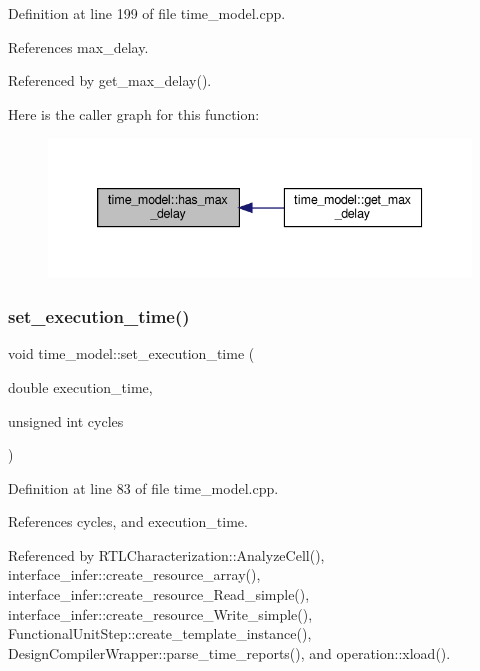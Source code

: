 Definition at line 199 of file time\+\_\+model.\+cpp.



References max\+\_\+delay.



Referenced by get\+\_\+max\+\_\+delay().

Here is the caller graph for this function\+:
\nopagebreak
\begin{figure}[H]
\begin{center}
\leavevmode
\includegraphics[width=339pt]{d3/d73/classtime__model_a952ed32fa9811586da4af0c94471f7ae_icgraph}
\end{center}
\end{figure}
\mbox{\label{classtime__model_a7bdad7b4a8221d4e5e00286e38084de1}} 
\subsubsection{\texorpdfstring{set\+\_\+execution\+\_\+time()}{set\_execution\_time()}}
{\footnotesize\ttfamily void time\+\_\+model\+::set\+\_\+execution\+\_\+time (\begin{DoxyParamCaption}\item[{double}]{execution\+\_\+time,  }\item[{unsigned int}]{cycles }\end{DoxyParamCaption})}



Definition at line 83 of file time\+\_\+model.\+cpp.



References cycles, and execution\+\_\+time.



Referenced by R\+T\+L\+Characterization\+::\+Analyze\+Cell(), interface\+\_\+infer\+::create\+\_\+resource\+\_\+array(), interface\+\_\+infer\+::create\+\_\+resource\+\_\+\+Read\+\_\+simple(), interface\+\_\+infer\+::create\+\_\+resource\+\_\+\+Write\+\_\+simple(), Functional\+Unit\+Step\+::create\+\_\+template\+\_\+instance(), Design\+Compiler\+Wrapper\+::parse\+\_\+time\+\_\+reports(), and operation\+::xload().

